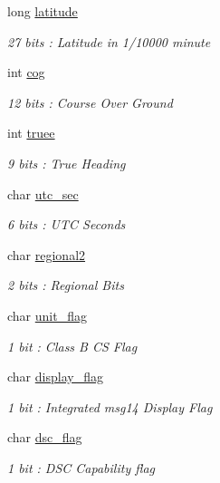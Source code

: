 \begin{DoxyCompactItemize}
long \mbox{\hyperlink{structaismsg__18_aa6a23fa689523d11dd9b9bf6f5884dce}{latitude}}
\begin{DoxyCompactList}\small\item\em 27 bits \+: Latitude in 1/10000 minute \end{DoxyCompactList}\item 
int \mbox{\hyperlink{structaismsg__18_a4197557730ba29c58eff91232bd2df8c}{cog}}
\begin{DoxyCompactList}\small\item\em 12 bits \+: Course Over Ground \end{DoxyCompactList}\item 
int \mbox{\hyperlink{structaismsg__18_af2d1be0927888078ec95b1079809ca2e}{truee}}
\begin{DoxyCompactList}\small\item\em 9 bits \+: True Heading \end{DoxyCompactList}\item 
char \mbox{\hyperlink{structaismsg__18_afb1c5d241b518e43e8dd43849867c805}{utc\+\_\+sec}}
\begin{DoxyCompactList}\small\item\em 6 bits \+: U\+TC Seconds \end{DoxyCompactList}\item 
char \mbox{\hyperlink{structaismsg__18_a22e05545137d473c132db988b024fc4f}{regional2}}
\begin{DoxyCompactList}\small\item\em 2 bits \+: Regional Bits \end{DoxyCompactList}\item 
char \mbox{\hyperlink{structaismsg__18_a57732ace4f42c2240ab3744b61420680}{unit\+\_\+flag}}
\begin{DoxyCompactList}\small\item\em 1 bit \+: Class B CS Flag \end{DoxyCompactList}\item 
char \mbox{\hyperlink{structaismsg__18_a68c4aa0f09dde99722bbc4f8dd6c2d95}{display\+\_\+flag}}
\begin{DoxyCompactList}\small\item\em 1 bit \+: Integrated msg14 Display Flag \end{DoxyCompactList}\item 
char \mbox{\hyperlink{structaismsg__18_a3cc9a895eb5fed0bfb4ad1f4f0c752eb}{dsc\+\_\+flag}}
\begin{DoxyCompactList}\small\item\em 1 bit \+: D\+SC Capability flag \end{DoxyCompactList}\item 

\end{DoxyCompactItemize}
